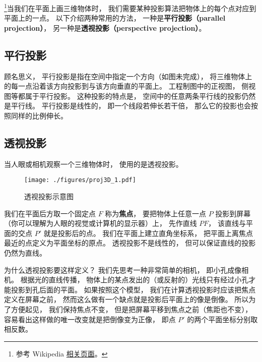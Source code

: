 
\begin{issues}
\issueTODO
\end{issues}

\footnote{参考 Wikipedia \href{https://en.wikipedia.org/wiki/3D_projection}{相关页面}。}当我们在平面上画三维物体时， 我们需要某种投影算法把物体上的每个点对应到平面上的一点。 以下介绍两种常用的方法， 一种是\textbf{平行投影（parallel projection）}， 另一种是\textbf{透视投影（perspective projection）}。


\subsection{平行投影}
顾名思义， 平行投影是指在空间中指定一个方向（如图未完成）， 将三维物体上的每一点沿着该方向投影到与该方向垂直的平面上。 工程制图中的正视图， 侧视图等都属于平行投影。 这种投影的特点是， 空间中的任意两条平行线的投影仍然是平行线。 平行投影是线性的， 即一个线段若伸长若干倍， 那么它的投影也会按照同样的比例伸长。

\subsection{透视投影}
当人眼或相机观察一个三维物体时， 使用的是透视投影。
\begin{figure}[ht]
\centering
\texttt{[image: ./figures/proj3D\_1.pdf]}
\caption{透视投影示意图} \label{proj3D_fig1}
\end{figure}

我们在平面后方取一个固定点 $F$ 称为\textbf{焦点}， 要把物体上任意一点 $P$ 投影到屏幕（你可以理解为人眼的视觉或计算机的显示器）上， 先作直线 $PF$， 该直线与平面的交点 $P'$ 就是投影后的点。 我们在平面上建立直角坐标系， 把平面上离焦点最近的点定义为平面坐标的原点。 透视投影不是线性的， 但可以保证直线的投影仍然为直线。

为什么透视投影要这样定义？ 我们先思考一种非常简单的相机， 即小孔成像相机。 根据光的直线传播， 物体上的某点发出的（或反射的）光线只有经过小孔才能投影到孔后面的平面。 如果按照这个模型， 我们在计算透视投影时应该把焦点定义在屏幕之前， 然而这么做有一个缺点就是投影后平面上的像是倒像。 所以为了方便起见， 我们保持焦点不变， 但是把屏幕平移到焦点之前（焦距也不变）， 容易看出这样做的唯一改变就是把倒像变为正像， 即点 $P'$ 的两个平面坐标分别取相反数。 %

